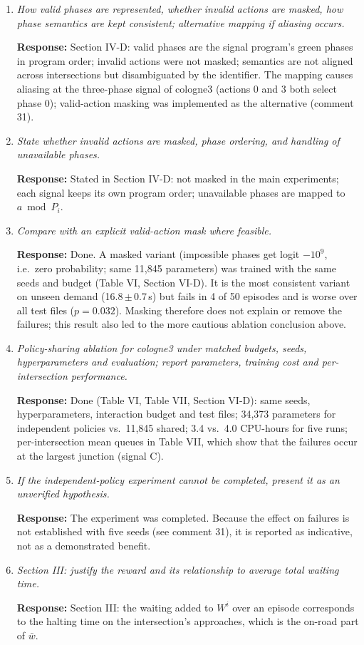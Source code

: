 \documentclass[11pt,a4paper]{article}
\newcommand{\cm}[2]{\item[\textbf{#1.}] \textit{#2}\par}
\newcommand{\re}{\par\textbf{Response:} }
\begin{document}
\begin{enumerate}[leftmargin=*, label={}, itemsep=6pt]
\cm{29}{How valid phases are represented, whether invalid actions are masked, how phase semantics are kept consistent; alternative mapping if aliasing occurs.}
\re Section IV-D: valid phases are the signal program's green phases in program order; invalid actions were not masked; semantics are not aligned across intersections but disambiguated by the identifier. The mapping causes aliasing at the three-phase signal of cologne3 (actions 0 and 3 both select phase 0); valid-action masking was implemented as the alternative (comment 31).

\cm{30}{State whether invalid actions are masked, phase ordering, and handling of unavailable phases.}
\re Stated in Section IV-D: not masked in the main experiments; each signal keeps its own program order; unavailable phases are mapped to $a \bmod P_i$.

\cm{31}{Compare with an explicit valid-action mask where feasible.}
\re Done. A masked variant (impossible phases get logit $-10^9$, i.e.\ zero probability; same 11,845 parameters) was trained with the same seeds and budget (Table VI, Section VI-D). It is the most consistent variant on unseen demand (16.8\,$\pm$\,0.7\,s) but fails in 4 of 50 episodes and is worse over all test files ($p=0.032$). Masking therefore does not explain or remove the failures; this result also led to the more cautious ablation conclusion above.

\cm{32}{Policy-sharing ablation for cologne3 under matched budgets, seeds, hyperparameters and evaluation; report parameters, training cost and per-intersection performance.}
\re Done (Table VI, Table VII, Section VI-D): same seeds, hyperparameters, interaction budget and test files; 34,373 parameters for independent policies vs.\ 11,845 shared; 3.4 vs.\ 4.0 CPU-hours for five runs; per-intersection mean queues in Table VII, which show that the failures occur at the largest junction (signal C).

\cm{33}{If the independent-policy experiment cannot be completed, present it as an unverified hypothesis.}
\re The experiment was completed. Because the effect on failures is not established with five seeds (see comment 31), it is reported as indicative, not as a demonstrated benefit.

\cm{34}{Section III: justify the reward and its relationship to average total waiting time.}
\re Section III: the waiting added to $W^i$ over an episode corresponds to the halting time on the intersection's approaches, which is the on-road part of $\bar{w}$.


\end{enumerate}
\end{document}
